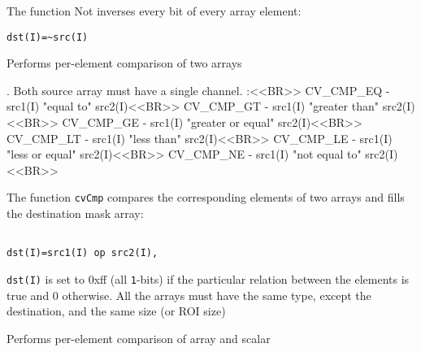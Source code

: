 \begin{description}
\end{description}


The function Not inverses every bit of every array element:

\begin{lstlisting}
dst(I)=~src(I)
\end{lstlisting}



Performs per-element comparison of two arrays


\begin{description}
. Both source array must have a single channel.
:<<BR>> CV\_CMP\_EQ - src1(I) "equal to" src2(I)<<BR>> CV\_CMP\_GT - src1(I) "greater than" src2(I)<<BR>> CV\_CMP\_GE - src1(I) "greater or equal" src2(I)<<BR>> CV\_CMP\_LT - src1(I) "less than" src2(I)<<BR>> CV\_CMP\_LE - src1(I) "less or equal" src2(I)<<BR>> CV\_CMP\_NE - src1(I) "not equal to" src2(I)<<BR>>
\end{description}

The function \texttt{cvCmp} compares the corresponding elements of two arrays and fills the destination mask array:

\begin{lstlisting}

dst(I)=src1(I) op src2(I),

\end{lstlisting}

\texttt{dst(I)} is set to 0xff (all \texttt{1}-bits) if the particular relation between the elements is true and 0 otherwise. All the arrays must have the same type, except the destination, and the same size (or ROI size)


Performs per-element comparison of array and scalar


